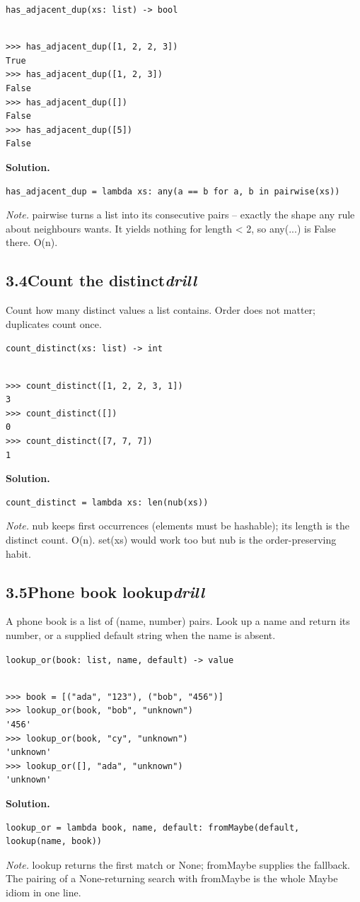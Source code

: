 \documentclass[10pt,letterpaper]{book}
\begin{document}
\noindent\texttt{has\_adjacent\_dup(xs: list) -> bool}
\begin{lstlisting}[style=ex]

>>> has_adjacent_dup([1, 2, 2, 3])
True
>>> has_adjacent_dup([1, 2, 3])
False
>>> has_adjacent_dup([])
False
>>> has_adjacent_dup([5])
False

\end{lstlisting}
\noindent\textbf{Solution.}
\begin{lstlisting}[style=code]
has_adjacent_dup = lambda xs: any(a == b for a, b in pairwise(xs))
\end{lstlisting}
\noindent\textit{Note.} pairwise turns a list into its consecutive pairs -- exactly the shape any rule about neighbours wants. It yields nothing for length < 2, so any(...) is False there. O(n).

\subsection*{3.4\quad Count the distinct\hfill\textnormal{\textit{drill}}}
Count how many distinct values a list contains. Order does not matter; duplicates count once.

\noindent\texttt{count\_distinct(xs: list) -> int}
\begin{lstlisting}[style=ex]

>>> count_distinct([1, 2, 2, 3, 1])
3
>>> count_distinct([])
0
>>> count_distinct([7, 7, 7])
1

\end{lstlisting}
\noindent\textbf{Solution.}
\begin{lstlisting}[style=code]
count_distinct = lambda xs: len(nub(xs))
\end{lstlisting}
\noindent\textit{Note.} nub keeps first occurrences (elements must be hashable); its length is the distinct count. O(n). set(xs) would work too but nub is the order-preserving habit.

\subsection*{3.5\quad Phone book lookup\hfill\textnormal{\textit{drill}}}
A phone book is a list of (name, number) pairs. Look up a name and return its number, or a supplied default string when the name is absent.

\noindent\texttt{lookup\_or(book: list, name, default) -> value}
\begin{lstlisting}[style=ex]

>>> book = [("ada", "123"), ("bob", "456")]
>>> lookup_or(book, "bob", "unknown")
'456'
>>> lookup_or(book, "cy", "unknown")
'unknown'
>>> lookup_or([], "ada", "unknown")
'unknown'

\end{lstlisting}
\noindent\textbf{Solution.}
\begin{lstlisting}[style=code]
lookup_or = lambda book, name, default: fromMaybe(default, lookup(name, book))
\end{lstlisting}
\noindent\textit{Note.} lookup returns the first match or None; fromMaybe supplies the fallback. The pairing of a None-returning search with fromMaybe is the whole Maybe idiom in one line.
\end{document}
